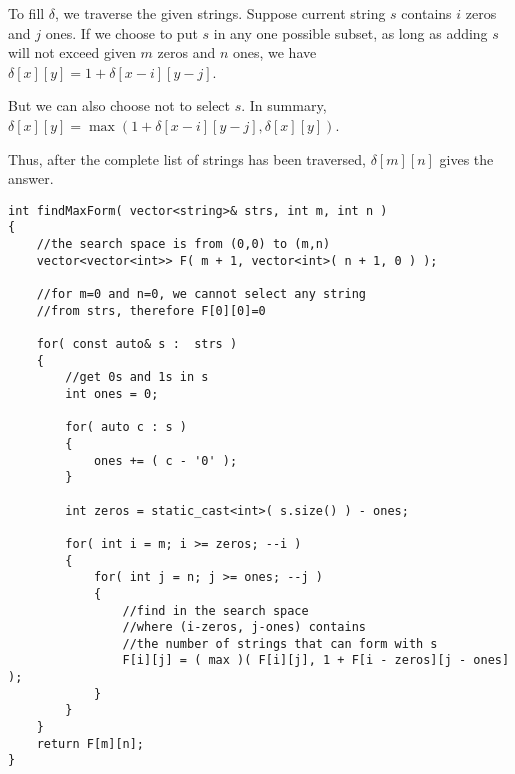 To fill $\delta$, we traverse the given strings. Suppose current string $s$ contains $i$ zeros and $j$ ones. If we choose to put $s$ in any one possible subset, as long as adding $s$ will not exceed given $m$ zeros and $n$ ones, we have $\delta[x][y] = 1 + \delta[x-i][y-j]$.

But we can also choose not to select $s$. In summary, $\delta[x][y] = \max(1 + \delta[x-i][y-j], \delta[x][y])$.

Thus, after the complete list of strings has been traversed, $\delta[m][n]$ gives the answer.

\setcounter{lstlisting}{0}
\begin{lstlisting}[style=customc, caption={0-1 knapsack problem}]
int findMaxForm( vector<string>& strs, int m, int n )
{
    //the search space is from (0,0) to (m,n)
    vector<vector<int>> F( m + 1, vector<int>( n + 1, 0 ) );

    //for m=0 and n=0, we cannot select any string
    //from strs, therefore F[0][0]=0

    for( const auto& s :  strs )
    {
        //get 0s and 1s in s
        int ones = 0;

        for( auto c : s )
        {
            ones += ( c - '0' );
        }

        int zeros = static_cast<int>( s.size() ) - ones;

        for( int i = m; i >= zeros; --i )
        {
            for( int j = n; j >= ones; --j )
            {
                //find in the search space
                //where (i-zeros, j-ones) contains
                //the number of strings that can form with s
                F[i][j] = ( max )( F[i][j], 1 + F[i - zeros][j - ones] );
            }
        }
    }
    return F[m][n];
}
\end{lstlisting}